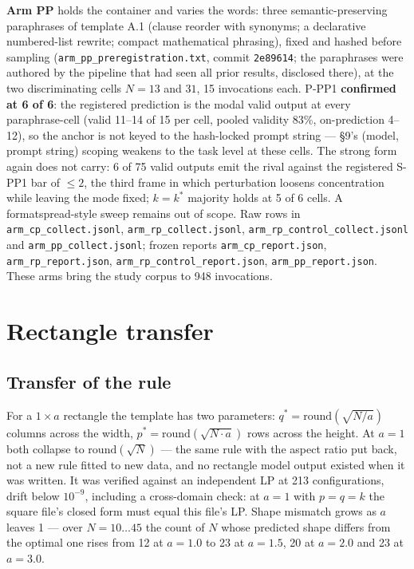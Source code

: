 \textbf{Arm PP} holds the container and varies the words: three semantic-preserving
paraphrases of template A.1 (clause reorder with synonyms; a declarative numbered-list
rewrite; compact mathematical phrasing), fixed and hashed before sampling
(\texttt{arm\_pp\_preregistration.txt}, commit \texttt{2e89614}; the paraphrases were
authored by the pipeline that had seen all prior results, disclosed there), at the two
discriminating cells $N = 13$ and $31$, 15 invocations each. P-PP1 \textbf{confirmed at
6 of 6}: the registered prediction is the modal valid output at every paraphrase-cell
(valid 11--14 of 15 per cell, pooled validity 83\%, on-prediction 4--12), so the anchor
is not keyed to the hash-locked prompt string --- \S9's (model, prompt string) scoping
weakens to the task level at these cells. The strong form again does not carry: 6 of 75
valid outputs emit the rival against the registered S-PP1 bar of $\le 2$, the third
frame in which perturbation loosens concentration while leaving the mode fixed;
$k = k^*$ majority holds at 5 of 6 cells. A formatspread-style sweep
\citep{sclar2024formatspread} remains out of scope. Raw rows in
\texttt{arm\_cp\_collect.jsonl}, \texttt{arm\_rp\_collect.jsonl},
\texttt{arm\_rp\_control\_collect.jsonl} and \texttt{arm\_pp\_collect.jsonl}; frozen
reports \texttt{arm\_cp\_report.json}, \texttt{arm\_rp\_report.json},
\texttt{arm\_rp\_control\_report.json}, \texttt{arm\_pp\_report.json}. These arms bring
the study corpus to 948 invocations.

\section{Rectangle transfer}

\subsection{Transfer of the rule}

For a $1 \times a$ rectangle the template has two parameters: $q^* = \mathrm{round}(\sqrt{N/a})$ columns across the
width, $p^* = \mathrm{round}(\sqrt{N \cdot a})$ rows across the height. At $a = 1$ both collapse to $\mathrm{round}(\sqrt{N})$ --- the
same rule with the aspect ratio put back, not a new rule fitted to new data, and no rectangle
model output existed when it was written. It was verified against an independent LP at 213
configurations, drift below $10^{-9}$, including a cross-domain check: at $a = 1$ with $p = q = k$ the
square file's closed form must equal this file's LP. Shape mismatch grows as $a$ leaves 1 --- over
$N = 10\ldots45$ the count of $N$ whose predicted shape differs from the optimal one rises from 12 at
$a = 1.0$ to 23 at $a = 1.5$, 20 at $a = 2.0$ and 23 at $a = 3.0$.

